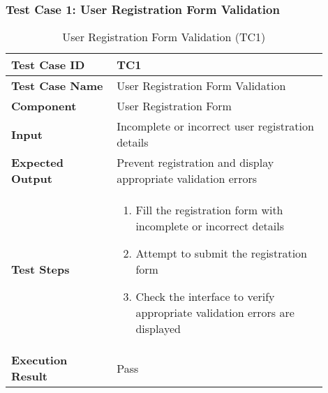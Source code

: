 \begin{table}[h]
	\subsubsection{Test Case 1: User Registration Form Validation}
	\centering
	\caption{User Registration Form Validation (TC1)}
	\begin{tabular}{|p{0.3\linewidth}|p{0.6\linewidth}|}
		\hline
		\textbf{Test Case ID} & TC1 \\
		\hline
		\textbf{Test Case Name} & User Registration Form Validation \\
		\hline
		\textbf{Component} & User Registration Form \\
		\hline
		\textbf{Input} & Incomplete or incorrect user registration details \\
		\hline
		\textbf{Expected Output} & Prevent registration and display appropriate validation errors \\
		\hline
		\textbf{Test Steps} & 
		\begin{enumerate}
			\item Fill the registration form with incomplete or incorrect details
			\item Attempt to submit the registration form
			\item Check the interface to verify appropriate validation errors are displayed
		\end{enumerate} \\
		\hline
		\textbf{Execution Result} & Pass \\
		\hline
	\end{tabular}
\end{table}



